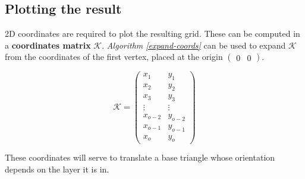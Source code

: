 \documentclass{article}
\begin{document}
\subsection{Plotting the result}
2D coordinates are required to plot the resulting grid. These can be computed in a \textbf{coordinates matrix} $\mathcal{K}$. \textit{Algorithm \ref{expand-coords}} can be used to expand $\mathcal{K}$ from the coordinates of the first vertex, placed at the origin $\begin{pmatrix}0&0\end{pmatrix}$.

\begin{equation}
\mathcal{K}=
\begin{pmatrix}
x_1 & y_1 \\
x_2 & y_2 \\
x_3 & y_3 \\
\vdots & \vdots \\
x_{o-2} & y_{o-2} \\
x_{o-1} & y_{o-1} \\
x_o & y_o 
\end{pmatrix}
\end{equation}

\medskip

These coordinates will serve to translate a base triangle whose orientation depends on the layer it is in. 
\end{document}
